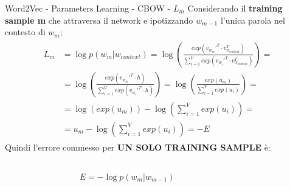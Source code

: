\documentclass[british]{beamer}
\begin{document}
\begin{frame}{Word2Vec - Parameters Learning - CBOW - \(L_m\)}
	Considerando il \textbf{training sample m} che attraversa il network e ipotizzando \(w_{m-1}\) l'unica parola nel contesto di \(w_{m}\);
	\begin{gather*}
		\begin{split}
		L_m &= \log p(w_{m}|w_{context}) = 
		\log \left( \frac{exp(v_{w_{m}}'^T \cdot v_{w_{context}}^T)}{\sum_{i=1}^{V} exp(v_{w_{i}}'^T \cdot v_{w_{context}}^T)} \right) = 
		\\
		&= \log \left( \frac{exp(v_{w_{m}}'^T \cdot h)}{\sum_{i=1}^{V} exp(v_{w_{i}}'^T \cdot h)} \right) =
		\log \left( \frac{exp(u_m)}{\sum_{i=1}^{V} exp(u_i)} \right) =
		\\
		&= \log \left( exp(u_m) \right) - \log \left( \sum_{i=1}^{V} exp(u_i) \right) =
		\\
		&= u_m - \log \left( \sum_{i=1}^{V} exp(u_i) \right) = -E
		\end{split}
	\end{gather*}
	Quindi l'errore commesso per \textbf{UN SOLO TRAINING SAMPLE} \`{e}:
	\begin{columns}
		\begin{column}{0.3\textwidth}
			
		\end{column}
		\begin{column}{0.4\textwidth}
			\(E = -\log p(w_{m}|w_{m-1})\)
		\end{column}
		\begin{column}{0.3\textwidth}
			
		\end{column}
	\end{columns}
\end{frame}
\end{document}
